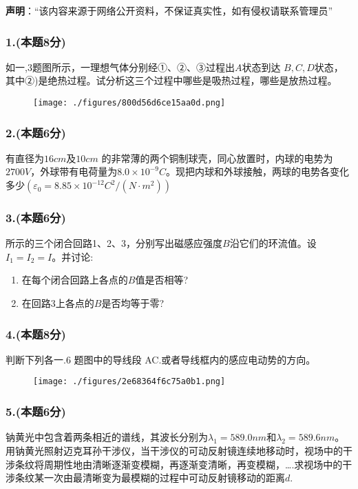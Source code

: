 
\textbf{声明}：“该内容来源于网络公开资料，不保证真实性，如有侵权请联系管理员”

\subsubsection{1.(本题8分)}
如一,3题图所示，一理想气体分别经①、②、③过程出$A$状态到达 $B,C,D$状态，其中②)是绝热过程。试分析这三个过程中哪些是吸热过程，哪些是放热过程。
\begin{figure}[ht]
\centering
\texttt{[image: ./figures/800d56d6ce15aa0d.png]}
\caption{} \label{fig_CD13_1}
\end{figure}
\subsubsection{2.(本题6分)}
有直径为$16cm$及$10cm$ 的非常薄的两个铜制球壳，同心放置时，内球的电势为 $2700V$，外球带有电荷量为$8.0\times10^{-9}C$。现把内球和外球接触，两球的电势各变化多少$(\varepsilon_0=8.85\times10^{-12} C^2/(N\cdot m^2))$
\subsubsection{3.(本题6分)}
所示的三个闭合回路1、2、3，分别写出磁感应强度$B$沿它们的环流值。设$I_1=I_2=I$。并讨论:
\begin{enumerate}
\item 在每个闭合回路上各点的$B$值是否相等?
\item 在回路3上各点的$B$是否均等于零?
\end{enumerate}
\subsubsection{4.(本题8分)}
判断下列各一.6 题图中的导线段 AC.或者导线框内的感应电动势的方向。
\begin{figure}[ht]
\centering
\texttt{[image: ./figures/2e68364f6c75a0b1.png]}
\caption{} \label{fig_CD13_2}
\end{figure}
\subsubsection{5.(本题6分)}
钠黄光中包含着两条相近的谱线，其波长分别为$\lambda_1=589.0nm$和$\lambda_2=589.6nm$。用钠黄光照射迈克耳孙干涉仪，当干涉仪的可动反射镜连续地移动时，视场中的干涉条纹将周期性地由清晰逐渐变模糊，再逐渐变清晰，再变模糊，….求视场中的干涉条纹某一次由最清晰变为最模糊的过程中可动反射镜移动的距离$d$.
